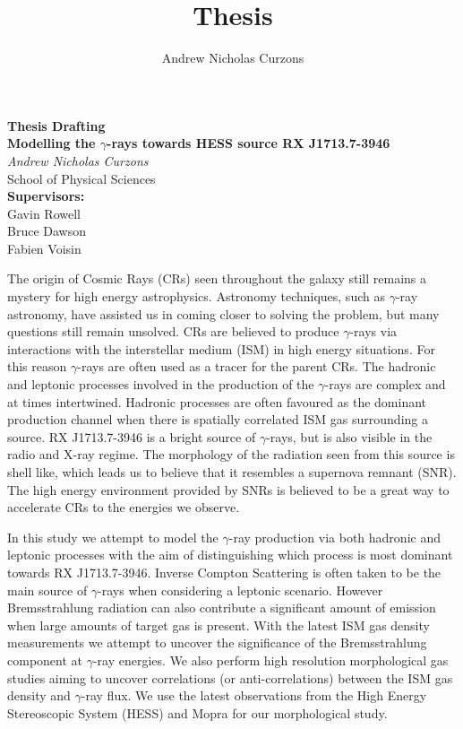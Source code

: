 \documentclass[12pt,a4paper]{article}
\title{Thesis}
\author{Andrew Nicholas Curzons}
\begin{document}
\thispagestyle{empty}
\begin{center}
	\Large\textbf{Thesis Drafting \\ \vspace{10 mm} Modelling the $\gamma$-rays towards HESS source RX J1713.7-3946}\\
	\vspace{10 mm}
	\large\textit{Andrew Nicholas Curzons\\}
	\vspace{10 mm}
	\large{School of Physical Sciences\\}
	\vspace{10 mm}
	\large{\textbf{Supervisors:}\\Gavin Rowell \\ Bruce Dawson \\ Fabien Voisin}
	\vspace{10 mm}
\end{center}
The origin of Cosmic Rays (CRs) seen throughout the galaxy still remains a mystery for high energy astrophysics. Astronomy techniques, such as $\gamma$-ray astronomy, have assisted us in coming closer to solving the problem, but many questions still remain unsolved. CRs are believed to produce $\gamma$-rays via interactions with the interstellar medium (ISM) in high energy situations. For this reason $\gamma$-rays are often used as a tracer for the parent CRs. The hadronic and leptonic processes involved in the production of the $\gamma$-rays are complex and at times intertwined. Hadronic processes are often favoured as the dominant production channel when there is spatially correlated ISM gas surrounding a source. RX J1713.7-3946 is a bright source of $\gamma$-rays, but is also visible in the radio and X-ray regime. The morphology of the radiation seen from this source is shell like, which leads us to believe that it resembles a supernova remnant (SNR). The high energy environment provided by SNRs is believed to be a great way to accelerate CRs to the energies we observe. 

In this study we attempt to model the $\gamma$-ray production via both hadronic and leptonic processes with the aim of distinguishing which process is most dominant towards RX J1713.7-3946. Inverse Compton Scattering is often taken to be the main source of $\gamma$-rays when considering a leptonic scenario. However Bremsstrahlung radiation can also contribute a significant amount of emission when large amounts of target gas is present. With the latest ISM gas density measurements we attempt to uncover the significance of the Bremsstrahlung component at $\gamma$-ray energies. We also perform high resolution morphological gas studies aiming to uncover correlations (or anti-correlations) between the ISM gas density and $\gamma$-ray flux. We use the latest observations from the High Energy Stereoscopic System (HESS) and Mopra for our morphological study. 
\end{document}
